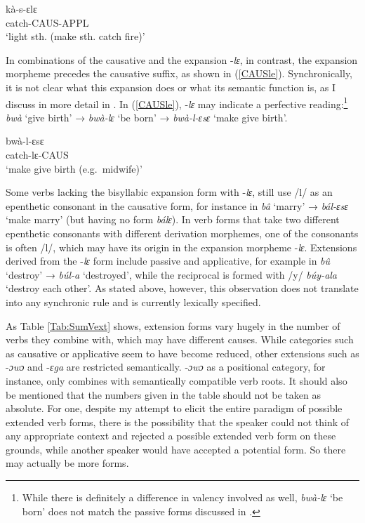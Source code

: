 \begin{exe}
\ex\label{CAUSAPP}
 \gll  kà-s-ɛlɛ  \\
         catch-CAUS-APPL \\
    \trans `light sth. (make sth. catch fire)'
\end {exe}

\noindent In combinations of the causative and the expansion -{\itshape lɛ}, in contrast, the expansion morpheme precedes the causative suffix, as shown in (\ref{CAUSle}).  Synchronically, it is not clear what this expansion does or what its semantic function is, as I discuss in more detail in . In (\ref{CAUSle}), -{\itshape lɛ} may indicate a perfective reading:\footnote{While there is definitely a difference in valency involved as well, {\itshape bwà-lɛ} `be born' does not match the passive forms discussed in .} {\itshape bwà} `give birth' → {\itshape bwà-lɛ} `be born' → {\itshape bwà-l-ɛsɛ} `make give birth'.

\begin{exe}
\ex\label{CAUSle}
 \gll  bwà-l-ɛsɛ  \\
         catch-lɛ-CAUS \\
    \trans `make give birth (e.g.\ midwife)'
\end {exe}

\noindent Some verbs lacking the bisyllabic expansion form with -{\itshape lɛ}, still use /l/  as an epenthetic consonant in the causative form, for instance in {\itshape bâ} `marry' → {\itshape bál-ɛsɛ} `make marry' (but having no form {\itshape bálɛ}). In verb forms that take two different epenthetic consonants with different derivation morphemes, one of the consonants is often /l/, which may have its origin in the expansion morpheme -{\itshape lɛ}. Extensions derived from the -{\itshape lɛ} form include passive and applicative, for example in {\itshape bû} `destroy' → {\itshape búl-a} `destroyed', while the reciprocal is formed with /y/ {\itshape búy-ala} `destroy each other'. As stated above, however, this observation does not translate into any synchronic rule and is currently lexically specified.

 As Table \ref{Tab:SumVext} shows, extension forms vary hugely in the number of verbs they combine with, which may have different causes. While categories such as causative or applicative seem to have become reduced, other extensions such as -{\itshape ɔwɔ} and -{\itshape ɛga} are restricted semantically. -{\itshape ɔwɔ} as a positional category, for instance, only combines with semantically compatible verb roots. It should also be mentioned that the numbers given in the table should not be taken as absolute. For one, despite my attempt to elicit the entire paradigm of possible extended verb forms, there is the possibility that the speaker could not think of any appropriate context and rejected a possible extended verb form on these grounds, while another speaker would have accepted a potential form. So there may actually be more forms. 


